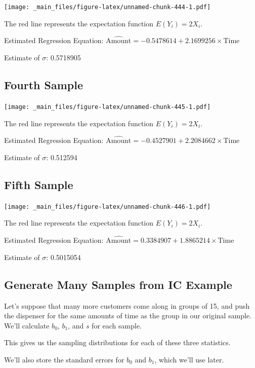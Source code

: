 \documentclass[]{book}
\begin{document}
\texttt{[image: \_main\_files/figure-latex/unnamed-chunk-444-1.pdf]}

The red line represents the expectation function \(E(Y_i) = 2X_i\).

Estimated Regression Equation:
\(\widehat{\text{Amount}} = -0.5478614 + 2.1699256\times \text{Time}\)

Estimate of \(\sigma\): 0.5718905

\subsection{Fourth Sample}\label{fourth-sample}

\texttt{[image: \_main\_files/figure-latex/unnamed-chunk-445-1.pdf]}

The red line represents the expectation function \(E(Y_i) = 2X_i\).

Estimated Regression Equation:
\(\widehat{\text{Amount}} = -0.4527901 + 2.2084662\times \text{Time}\)

Estimate of \(\sigma\): 0.512594

\subsection{Fifth Sample}\label{fifth-sample}

\texttt{[image: \_main\_files/figure-latex/unnamed-chunk-446-1.pdf]}

The red line represents the expectation function \(E(Y_i) = 2X_i\).

Estimated Regression Equation:
\(\widehat{\text{Amount}} = 0.3384907 + 1.8865214\times \text{Time}\)

Estimate of \(\sigma\): 0.5015054

\subsection{Generate Many Samples from IC
Example}\label{generate-many-samples-from-ic-example}

Let's suppose that many more customers come along in groups of 15, and
push the dispenser for the same amounts of time as the group in our
original sample. We'll calculate \(b_0\), \(b_1\), and \(s\) for each
sample.

This gives us the sampling distributions for each of these three
statistics.

We'll also store the standard errors for \(b_0\) and \(b_1\), which
we'll use later.
\end{document}
